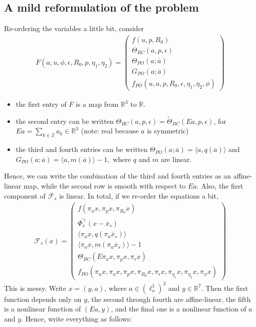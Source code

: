 \documentclass[10pt]{article}
\newcommand{\R}{\mathbb{R}}
\newcommand{\Z}{\mathbb{Z}}
\begin{document}
\subsection{A mild reformulation of the problem}
Re-ordering the variables a little bit, consider 
\begin{align*}
F(a,u,\phi,\epsilon,R_0,p,\eta_1,\eta_2)=\left(\begin{array}{c}f(u,p,R_0)\\  \Theta_{BC}(a,p,\epsilon) \\ \Theta_{PO}(a;\overline a) \\ G_{PO}(a;\overline a) \\  f_{PO}(u,a,p,R_0,\epsilon,\eta_1,\eta_2,\phi)  \end{array}\right)
\end{align*}
\begin{itemize}
\item the first entry of $F$ is a map from $\R^3$ to $\R$.
\item the second entry can be written $\Theta_{BC}(a,p,\epsilon) = \tilde\Theta_{BC}(Ea,p,\epsilon)$, for $Ea = \sum_{k\in\Z}a_k\in\R^3$ (note: real because $a$ is symmetric)
\item the third and fourth entries can be written $\Theta_{PO}(a;\overline a) = \langle a,q(\overline a)\rangle$ and $G_{PO}(a;\overline a)=\langle a,m(\overline a)\rangle-1,$ where $q$ and $m$ are linear.
\end{itemize}
Hence, we can write the combination of the third and fourth entries as an affine-linear map, while the second row is smooth with respect to $Ea$. Also, the first component of $\mathcal{F}_s$ is linear. In total, if we re-order the equations a bit,
\begin{align*}
\mathcal{F}_s(x)=\left(\begin{array}{c}f(\pi_u x,\pi_p x,\pi_{R_0}x)\\ \overline{\Phi_s^\intercal} (x-\overline x_s) \\ \langle\pi_a x,q(\pi_a\overline x_s)\rangle \\ \langle\pi_a x, m(\pi_a\overline x_s)\rangle-1 \\ \Theta_{BC}(E\pi_a x,\pi_p x,\pi_\epsilon x)\\ f_{PO}(\pi_u x,\pi_a x,\pi_p x,\pi_{R_0}x,\pi_\epsilon x,\pi_{\eta_1}x,\pi_{\eta_2}x,\pi_\phi x)  \end{array}\right)
\end{align*}
This is messy. Write $x=(y,a)$, where $a\in(\ell_\nu^1)^3$ and $y\in\R^7$. Then the first function depends only on $y$, the second through fourth are affine-linear, the fifth is a nonlinear function of $(Ea,y)$, and the final one is a nonlinear function of $a$ and $y$. Hence, write everything as follows:
\end{document}
